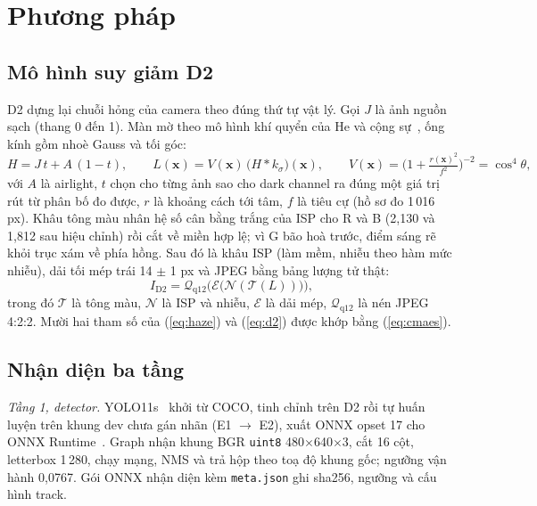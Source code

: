 \section{Phương pháp}\label{sec:phuong-phap}

\subsection{Mô hình suy giảm D2}\label{sec:suy-giam}

D2 dựng lại chuỗi hỏng của camera theo đúng thứ tự vật lý. Gọi $J$ là ảnh nguồn sạch (thang 0 đến 1). Màn mờ theo mô hình khí quyển của He và cộng sự~\cite{he-dcp}, ống kính gồm nhoè Gauss và tối góc:
\begin{equation}
H = J\,t + A\,(1-t),\qquad L(\mathbf{x}) = V(\mathbf{x})\,\big(H * k_{\sigma}\big)(\mathbf{x}),\qquad V(\mathbf{x})=\Big(1+\tfrac{r(\mathbf{x})^2}{f^2}\Big)^{-2}=\cos^4\theta,
\label{eq:haze}
\end{equation}
với $A$ là airlight, $t$ chọn cho từng ảnh sao cho dark channel ra đúng một giá trị rút từ phân bố đo được, $r$ là khoảng cách tới tâm, $f$ là tiêu cự (hồ sơ đo 1\,016 px). Khâu tông màu nhân hệ số cân bằng trắng của ISP cho R và B (2,130 và 1,812 sau hiệu chỉnh) rồi cắt về miền hợp lệ; vì G bão hoà trước, điểm sáng rẽ khỏi trục xám về phía hồng. Sau đó là khâu ISP (làm mềm, nhiễu theo hàm mức nhiễu), dải tối mép trái 14 $\pm$ 1 px và JPEG bằng bảng lượng tử thật:
\begin{equation}
I_{\mathrm{D2}} = \mathcal{Q}_{\mathrm{q12}}\Big(\mathcal{E}\big(\mathcal{N}(\mathcal{T}(L))\big)\Big),
\label{eq:d2}
\end{equation}
trong đó $\mathcal{T}$ là tông màu, $\mathcal{N}$ là ISP và nhiễu, $\mathcal{E}$ là dải mép, $\mathcal{Q}_{\mathrm{q12}}$ là nén JPEG 4:2:2. Mười hai tham số của (\ref{eq:haze}) và (\ref{eq:d2}) được khớp bằng (\ref{eq:cmaes}).

\subsection{Nhận diện ba tầng}

\textit{Tầng 1, detector.} YOLO11s~\cite{yolo11} khởi từ COCO, tinh chỉnh trên D2 rồi tự huấn luyện trên khung dev chưa gán nhãn (E1 $\to$ E2), xuất ONNX opset 17 cho ONNX Runtime~\cite{onnxrt}. Graph nhận khung BGR \texttt{uint8} 480$\times$640$\times$3, cắt 16 cột, letterbox 1\,280, chạy mạng, NMS và trả hộp theo toạ độ khung gốc; ngưỡng vận hành 0,0767. Gói ONNX nhận diện kèm \texttt{meta.json} ghi sha256, ngưỡng và cấu hình track.

